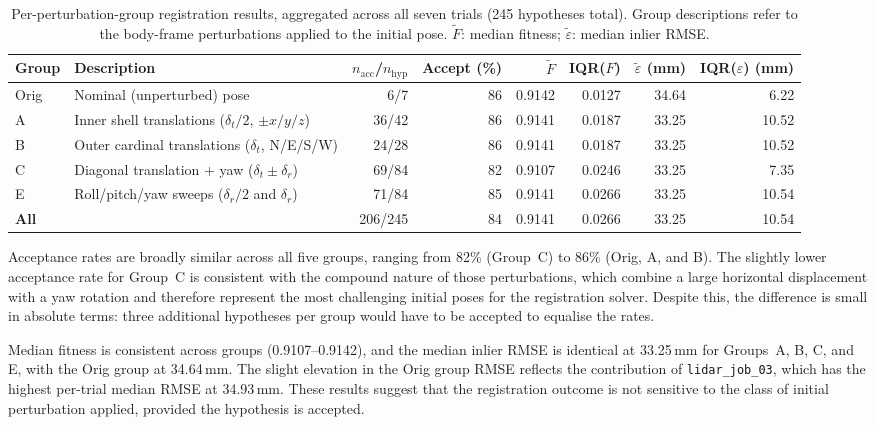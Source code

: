 \begin{table}[htbp]
  \centering
  \small
  \setlength{\tabcolsep}{4pt}
  \caption{Per-perturbation-group registration results, aggregated across all seven trials (245 hypotheses total). Group descriptions refer to the body-frame perturbations applied to the initial pose. $\tilde{F}$: median fitness; $\tilde{\varepsilon}$: median inlier RMSE.}
  \label{tab:pa-results-groups}
  \begin{tabularx}{\textwidth}{@{} l >{\raggedright}X r r r r r r @{}}
    \toprule
    \textbf{Group} &
    \textbf{Description} &
    \boldmath$n_\text{acc}$\textbf{/}\boldmath$n_\text{hyp}$ &
    \textbf{Accept (\%)} &
    \boldmath$\tilde{F}$ &
    \textbf{IQR(}\boldmath$F$\textbf{)} &
    \boldmath$\tilde{\varepsilon}$ \textbf{(mm)} &
    \textbf{IQR(}\boldmath$\varepsilon$\textbf{) (mm)} \\
    \midrule
    Orig   & Nominal (unperturbed) pose         &  6/7   & 86 & 0.9142 & 0.0127 & 34.64 &  6.22 \\
    A      & Inner shell translations ($\delta_t/2$, $\pm x/y/z$) & 36/42  & 86 & 0.9141 & 0.0187 & 33.25 & 10.52 \\
    B      & Outer cardinal translations ($\delta_t$, N/E/S/W)     & 24/28  & 86 & 0.9141 & 0.0187 & 33.25 & 10.52 \\
    C      & Diagonal translation + yaw ($\delta_t \pm \delta_r$)  & 69/84  & 82 & 0.9107 & 0.0246 & 33.25 &  7.35 \\
    E      & Roll/pitch/yaw sweeps ($\delta_r/2$ and $\delta_r$)   & 71/84  & 85 & 0.9141 & 0.0266 & 33.25 & 10.54 \\
    \midrule
    \textbf{All} & & 206/245 & 84 & 0.9141 & 0.0266 & 33.25 & 10.54 \\
    \bottomrule
  \end{tabularx}
\end{table}

Acceptance rates are broadly similar across all five groups, ranging from 82\% (Group~C) to 86\% (Orig, A, and B). The slightly lower acceptance rate for Group~C is consistent with the compound nature of those perturbations, which combine a large horizontal displacement with a yaw rotation and therefore represent the most challenging initial poses for the registration solver. Despite this, the difference is small in absolute terms: three additional hypotheses per group would have to be accepted to equalise the rates.

Median fitness is consistent across groups (0.9107--0.9142), and the median inlier RMSE is identical at 33.25\,mm for Groups~A, B, C, and E, with the Orig group at 34.64\,mm. The slight elevation in the Orig group RMSE reflects the contribution of \texttt{lidar\_job\_03}, which has the highest per-trial median RMSE at 34.93\,mm. These results suggest that the registration outcome is not sensitive to the class of initial perturbation applied, provided the hypothesis is accepted.

